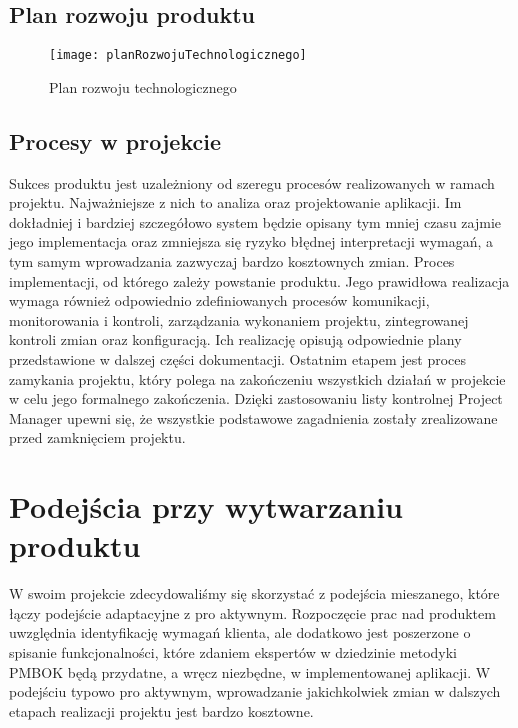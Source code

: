 \subsection*{Plan rozwoju produktu}
\begin{figure}[!h]
\centering
\texttt{[image: planRozwojuTechnologicznego]}
\caption{Plan rozwoju technologicznego}
\label{planRozwojuTechnologicznego}
\end{figure}

\subsection*{Procesy w projekcie}
Sukces produktu jest uzależniony od szeregu procesów realizowanych w ramach projektu. Najważniejsze z nich to analiza oraz projektowanie aplikacji. Im dokładniej i bardziej szczegółowo system będzie opisany tym mniej czasu zajmie jego implementacja oraz zmniejsza się ryzyko błędnej interpretacji wymagań, a tym samym wprowadzania zazwyczaj bardzo kosztownych zmian. Proces implementacji, od którego zależy powstanie produktu. Jego prawidłowa realizacja wymaga również odpowiednio zdefiniowanych procesów komunikacji, monitorowania i kontroli, zarządzania wykonaniem projektu, zintegrowanej kontroli zmian oraz konfiguracją. Ich realizację opisują odpowiednie plany przedstawione w dalszej części dokumentacji. Ostatnim etapem jest proces zamykania projektu, który polega na zakończeniu wszystkich działań w projekcie w celu jego formalnego zakończenia. Dzięki zastosowaniu listy kontrolnej Project Manager upewni się, że wszystkie podstawowe zagadnienia zostały zrealizowane przed zamknięciem projektu.


\section{Podejścia przy wytwarzaniu produktu}
	W swoim projekcie zdecydowaliśmy się skorzystać z podejścia mieszanego, które łączy podejście adaptacyjne z pro aktywnym. Rozpoczęcie prac nad produktem uwzględnia identyfikację wymagań klienta, ale dodatkowo jest poszerzone o spisanie funkcjonalności, które zdaniem ekspertów w dziedzinie metodyki PMBOK będą przydatne, a wręcz niezbędne, w implementowanej aplikacji. W podejściu typowo pro aktywnym, wprowadzanie jakichkolwiek zmian w dalszych etapach realizacji projektu jest bardzo kosztowne. 

